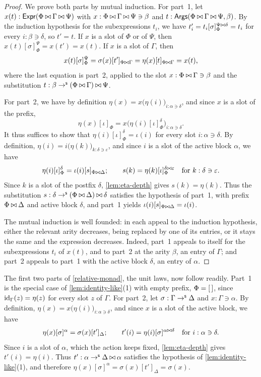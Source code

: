 \begin{proof}
    We prove both parts by mutual induction.
    For part~1, let $x(t) : \mathsf{Expr}(\Phi\mathbin{\bowtie}\Gamma\mathbin{\bowtie}\Psi)$ with $x : \Phi \mathbin{\bowtie} \Gamma \mathbin{\bowtie} \Psi \ni \beta$ and $t : \mathsf{Args}(\Phi \mathbin{\bowtie} \Gamma \mathbin{\bowtie} \Psi, \beta)$. By the induction hypothesis for the subexpressions $t_i$, we have $t'_i = t_i[\sigma]_\Phi^{\Psi \mathbin{\bowtie} \delta} = t_i$ for every $i : \beta \ni \delta$, so $t' = t$. If $x$ is a slot of $\Phi$ or of $\Psi$, then $x(t)[\sigma]_\Phi^\Psi = x(t') = x(t)$. If $x$ is a slot of $\Gamma$, then
    \[
    x(t)[\sigma]_\Phi^\Psi = \sigma(x)[t']_{\Phi \mathbin{\bowtie} \Gamma} = \eta(x)[t]_{\Phi \mathbin{\bowtie} \Gamma} = x(t),
    \]
    where the last equation is part~2, applied to the slot $x : \Phi \mathbin{\bowtie} \Gamma \ni \beta$ and the substitution $t : \beta \to^{\mathsf{s}} (\Phi \mathbin{\bowtie} \Gamma) \mathbin{\bowtie} \Psi$.

    For part~2, we have by definition $\eta(x) = x\big(\eta(i)\big)_{i : \alpha \ni \delta}$, and since $x$ is a slot of the prefix,
    \[
    \eta(x)[\iota]_\Phi = x\big(\eta(i)[\iota]_\Phi^\delta\big)_{i : \alpha \ni \delta}.
    \]
    It thus suffices to show that $\eta(i)[\iota]_\Phi^\delta = \iota(i)$ for every slot $i : \alpha \ni \delta$. By definition, $\eta(i) = i\big(\eta(k)\big)_{k : \delta \ni \varepsilon}$, and since $i$ is a slot of the active block $\alpha$, we have
    \[
    \eta(i)[\iota]_\Phi^\delta = \iota(i)[s]_{\Phi \mathbin{\bowtie} \Delta}; \qquad s(k) = \eta(k)[\iota]_\Phi^{\delta \mathbin{\bowtie} \varepsilon} \quad \text{for } k : \delta \ni \varepsilon.
    \]
    Since $k$ is a slot of the postfix $\delta$, \cref{lem:eta-depth} gives $s(k) = \eta(k)$. Thus the substitution $s : \delta \to^{\mathsf{s}} (\Phi \mathbin{\bowtie} \Delta) \mathbin{\bowtie} \delta$ satisfies the hypothesis of part~1, with prefix $\Phi \mathbin{\bowtie} \Delta$ and active block $\delta$, and part~1 yields $\iota(i)[s]_{\Phi \mathbin{\bowtie} \Delta} = \iota(i)$.

    The mutual induction is well founded: in each appeal to the induction hypothesis, either the relevant arity decreases, being replaced by one of its entries, or it stays the same and the expression decreases. Indeed, part~1 appeals to itself for the subexpressions $t_i$ of $x(t)$, and to part~2 at the arity $\beta$, an entry of $\Gamma$; and part~2 appeals to part~1 with the active block $\delta$, an entry of $\alpha$.
\end{proof}

The first two parts of \cref{relative-monad}, the unit laws, now follow readily. Part~1 is the special case of \cref{lem:identity-like}(1) with empty prefix, $\Phi = \left[\,\right]$, since $\mathrm{id}_\Gamma(z) = \eta(z)$ for every slot $z$ of $\Gamma$. For part~2, let $\sigma : \Gamma \to^{\mathsf{s}} \Delta$ and $x : \Gamma \ni \alpha$. By definition, $\eta(x) = x\big(\eta(i)\big)_{i : \alpha \ni \delta}$, and since $x$ is a slot of the active block, we have
\[
\eta(x)[\sigma]^\alpha = \sigma(x)[t']_\Delta; \qquad t'(i) = \eta(i)[\sigma]^{\alpha \mathbin{\bowtie} \delta} \quad \text{for } i : \alpha \ni \delta.
\]
Since $i$ is a slot of $\alpha$, which the action keeps fixed, \cref{lem:eta-depth} gives $t'(i) = \eta(i)$. Thus $t' : \alpha \to^{\mathsf{s}} \Delta \mathbin{\bowtie} \alpha$ satisfies the hypothesis of \cref{lem:identity-like}(1), and therefore $\eta(x)[\sigma]^\alpha = \sigma(x)[t']_\Delta = \sigma(x)$.


